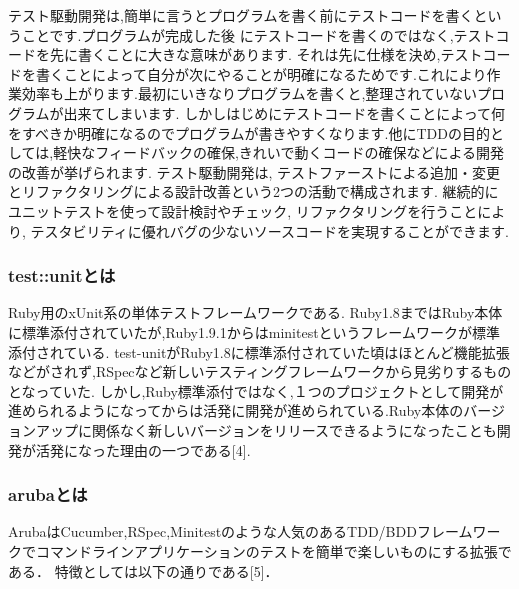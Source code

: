 テスト駆動開発は,簡単に言うとプログラムを書く前にテストコードを書くということです.プログラムが完成した後 にテストコードを書くのではなく,テストコードを先に書くことに大きな意味があります.
それは先に仕様を決め,テストコードを書くことによって自分が次にやることが明確になるためです.これにより作業効率も上がります.最初にいきなりプログラムを書くと,整理されていないプログラムが出来てしまいます.
しかしはじめにテストコードを書くことによって何をすべきか明確になるのでプログラムが書きやすくなります.他にTDDの目的としては,軽快なフィードバックの確保,きれいで動くコードの確保などによる開発の改善が挙げられます.
テスト駆動開発は, テストファーストによる追加・変更とリファクタリングによる設計改善という2つの活動で構成されます. 継続的にユニットテストを使って設計検討やチェック, リファクタリングを行うことにより, テスタビリティに優れバグの少ないソースコードを実現することができます. 

\subsubsection{test::unitとは}
Ruby用のxUnit系の単体テストフレームワークである. Ruby1.8まではRuby本体に標準添付されていたが,Ruby1.9.1からはminitestというフレームワークが標準添付されている.
test-unitがRuby1.8に標準添付されていた頃はほとんど機能拡張などがされず,RSpecなど新しいテスティングフレームワークから見劣りするものとなっていた.
しかし,Ruby標準添付ではなく,１つのプロジェクトとして開発が進められるようになってからは活発に開発が進められている.Ruby本体のバージョンアップに関係なく新しいバージョンをリリースできるようになったことも開発が活発になった理由の一つである[4].

\subsubsection{arubaとは}
ArubaはCucumber,RSpec,Minitestのような人気のあるTDD/BDDフレームワークでコマンドラインアプリケーションのテストを簡単で楽しいものにする拡張である．
特徴としては以下の通りである[5]．

